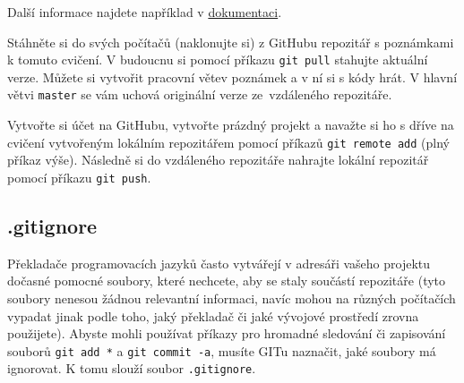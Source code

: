 \documentclass[a4paper,11pt,twoside]{article}
\def\code#1{\textnormal{\texttt{#1}}}
\begin{document}
        Další informace najdete například v \href{https://git-scm.com/book/cs/v2/Z%C3%A1klady-pr%C3%A1ce-se-syst%C3%A9mem-Git-Pr%C3%A1ce-se-vzd%C3%A1len%C3%BDmi-repozit%C3%A1%C5%99i}{dokumentaci}.

        \begin{task}
            Stáhněte si do svých počítačů (naklonujte si) z GitHubu repozitář s poznámkami k tomuto cvičení.
            V budoucnu si pomocí příkazu \code{git pull} stahujte aktuální verze.
            Můžete si vytvořit pracovní větev poznámek a v ní si s kódy hrát.
            V hlavní větvi \code{master} se vám uchová originální verze ze~vzdáleného repozitáře.
        \end{task}

        \begin{task}
            Vytvořte si účet na GitHubu, vytvořte prázdný projekt a navažte si ho s dříve na cvičení vytvořeným lokálním repozitářem pomocí příkazů \code{git remote add} (plný příkaz výše).
            Následně si do vzdáleného repozitáře nahrajte lokální repozitář pomocí příkazu \code{git push}. 
        \end{task}

    \subsection{.gitignore}
        Překladače programovacích jazyků často vytvářejí v adresáři vašeho projektu dočasné pomocné soubory, které nechcete, aby se staly součástí repozitáře (tyto soubory nenesou žádnou relevantní informaci, navíc mohou na různých počítačích vypadat jinak podle toho, jaký překladač či jaké vývojové prostředí zrovna použijete).
        Abyste mohli používat příkazy pro hromadné sledování či zapisování souborů \code{git add *} a \code{git commit -a}, musíte GITu naznačit, jaké soubory má ignorovat.
        K tomu slouží soubor \code{.gitignore}.
        
\end{document}

